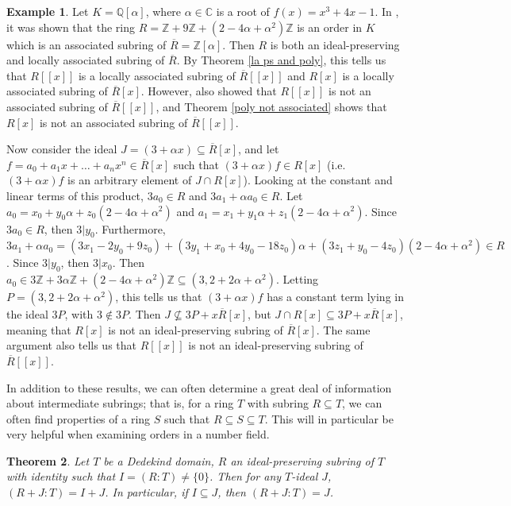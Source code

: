\documentclass[12pt]{amsart}
\newtheorem{theorem}{Theorem}[section]
\theoremstyle{definition}
\newtheorem{example}[theorem]{Example}
\newcommand{\bZ}{\mathbb Z}
\newcommand{\bQ}{\mathbb Q}
\newcommand{\bC}{\mathbb C}
\newcommand{\Rbar}{\overline{R}}
\begin{document}
	\begin{example}
		Let $K=\bQ[\alpha]$, where $\alpha\in\bC$ is a root of $f(x)=x^3+4x-1$. In \cite{radicalconductor}, it was shown that the ring $R=\bZ+9\bZ+(2-4\alpha+\alpha^2)\bZ$ is an order in $K$ which is an associated subring of $\Rbar=\bZ[\alpha]$. Then $R$ is both an ideal-preserving and locally associated subring of $\Rbar$. By Theorem \ref{la ps and poly}, this tells us that $R[[x]]$ is a locally associated subring of $\Rbar[[x]]$ and $R[x]$ is a locally associated subring of $\Rbar[x]$. However, \cite{radicalconductor} also showed that $R[[x]]$ is not an associated subring of $\Rbar[[x]]$, and Theorem \ref{poly not associated} shows that $R[x]$ is not an associated subring of $\Rbar[[x]]$.
		
		Now consider the ideal $J=(3+\alpha x)\subseteq \Rbar[x]$, and let $f=a_0+a_1x+\dots+a_nx^n\in \Rbar[x]$ such that $(3+\alpha x)f\in R[x]$ (i.e. $(3+\alpha x)f$ is an arbitrary element of $J\cap R[x]$). Looking at the constant and linear terms of this product, $3a_0\in R$ and $3a_1+\alpha a_0\in R$. Let $a_0=x_0+y_0\alpha+z_0(2-4\alpha+\alpha^2)$ and $a_1=x_1+y_1\alpha+z_1(2-4\alpha+\alpha^2)$. Since $3a_0\in R$, then $3|y_0$. Furthermore, $3a_1+\alpha a_0=(3x_1-2y_0+9z_0)+(3y_1+x_0+4y_0-18z_0)\alpha+(3z_1+y_0-4z_0)(2-4\alpha+\alpha^2)\in R$. Since $3|y_0$, then $3|x_0$. Then $a_0\in 3\bZ+3\alpha\bZ+(2-4\alpha+\alpha^2)\bZ\subseteq (3,2+2\alpha+\alpha^2)$. Letting $P=(3,2+2\alpha+\alpha^2)$, this tells us that $(3+\alpha x)f$ has a constant term lying in the ideal $3P$, with $3\notin 3P$. Then $J\nsubseteq 3P+x\Rbar[x]$, but $J\cap R[x]\subseteq 3P+x\Rbar[x]$, meaning that $R[x]$ is not an ideal-preserving subring of $\Rbar[x]$. The same argument also tells us that $R[[x]]$ is not an ideal-preserving subring of $\Rbar[[x]]$.
	\end{example}
	
	In addition to these results, we can often determine a great deal of information about intermediate subrings; that is, for a ring $T$ with subring $R\subseteq T$, we can often find properties of a ring $S$ such that $R\subseteq S\subseteq T$. This will in particular be very helpful when examining orders in a number field.
	
	\begin{theorem}
		\label{ip intermediate cond}
		Let $T$ be a Dedekind domain, $R$ an ideal-preserving subring of $T$ with identity such that $I=(R:T)\neq \{0\}$. Then for any $T$-ideal $J$, $(R+J:T)=I+J$. In particular, if $I\subseteq J$, then $(R+J:T)=J$.
	\end{theorem}
	
\end{document}

